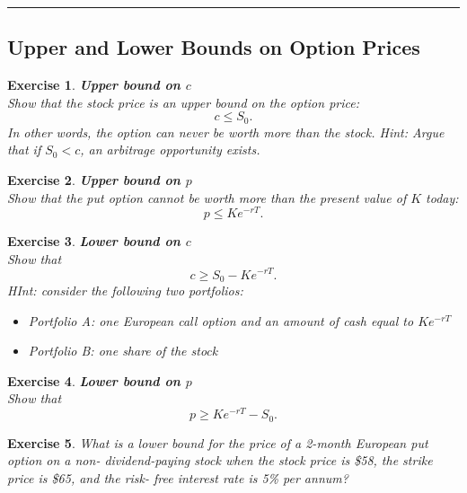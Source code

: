 \documentclass[letterpaper,10pt]{article}
\newtheorem{ex}{Exercise}
\begin{document}
\bigskip

\hrule

\bigskip

\subsection{Upper and Lower Bounds on Option Prices}


\begin{ex}{\bf Upper bound on $c$}\\
Show that the stock price is an upper bound on the option price:  $$c\leq S_0.$$  In other words, the option can never be worth more than the stock.
Hint:  Argue that if $S_0<c$, an arbitrage opportunity exists. 

\end{ex}


\begin{ex}{\bf Upper bound on $p$}\\
Show that the put option cannot be worth more than the present value of $K$ today:  $$p\leq Ke^{-rT}.$$  
\end{ex}


\begin{ex}{\bf Lower bound on $c$}\\
Show that $$c\geq S_0-Ke^{-rT}.$$  HInt: consider the following two portfolios:  

\begin{itemize}

\item Portfolio A:  one European call option and an amount of cash equal to $Ke^{-rT}$

\item Portfolio B:  one share of the stock

\end{itemize}




\end{ex}



\begin{ex}{\bf Lower bound on $p$}\\
Show that $$p\geq Ke^{-rT}-S_0.$$   
\end{ex}


\begin{ex}
What is a lower bound for the price of a 2-month European put option on a non- dividend-paying stock when the stock price is \$58, the strike price is \$65, and the risk- free interest rate is 5\% per annum?
\end{ex}
\end{document}
